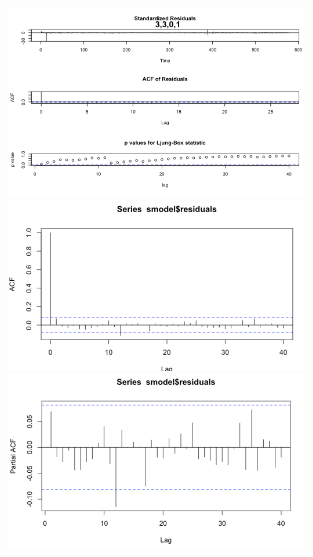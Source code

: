 \documentclass[a4paper,11pt]{article}
\begin{document}
    \begin{figure}[H]
        \centering
        \includegraphics[width=0.7\textwidth]{ha-1_files/figure-markdown_strict/3-3-0-1.png}
        \includegraphics[width=0.7\textwidth]{ha-1_files/figure-markdown_strict/3-3-0-1.1.png}
        \includegraphics[width=0.7\textwidth]{ha-1_files/figure-markdown_strict/3-3-0-1.2.png}
        \label{fig:f8}
    \end{figure}
\end{document}
